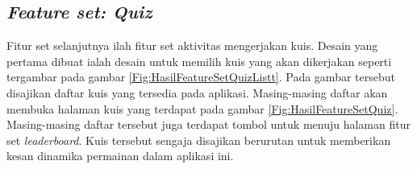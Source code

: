 \subsection{\textit{Feature set: Quiz}}
Fitur set selanjutnya ilah fitur set aktivitas mengerjakan kuis. 
Desain yang pertama dibuat ialah desain untuk memilih kuis yang akan dikerjakan seperti tergambar pada gambar \ref*{Fig:HasilFeatureSetQuizListt}.
Pada gambar tersebut disajikan daftar kuis yang tersedia pada aplikasi.
Masing-masing daftar akan membuka halaman kuis yang terdapat pada gambar \ref*{Fig:HasilFeatureSetQuiz}.
Masing-masing daftar tersebut juga terdapat tombol untuk menuju halaman fitur set \textit{leaderboard}.
Kuis tersebut sengaja disajikan berurutan untuk memberikan kesan dinamika permainan dalam aplikasi ini.
\begin{figure}[H]
	\centering
	\begin{subfigure}[b]{0.3\textwidth}
		\centering

\end{subfigure}
\end{figure}
